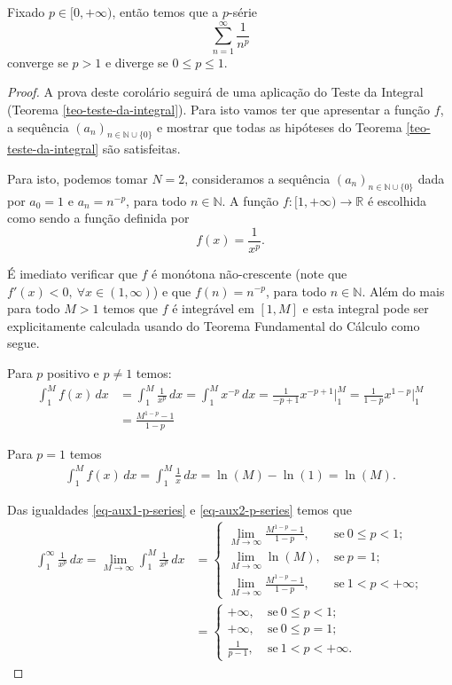 



\begin{corolario}\label{cor-crit-conv-p-series}
Fixado $p\in [0,+\infty)$, então temos que a $p$-série 
\[
\sum_{n=1}^{\infty} \frac{1}{n^p}
\] 
converge se $p>1$ e diverge se $0\leqslant p\leqslant 1$.
\end{corolario}

\begin{proof}
A prova deste corolário seguirá de uma aplicação do Teste da Integral
(Teorema \ref{teo-teste-da-integral}). Para isto vamos ter que apresentar 
a função $f$, a sequência $(a_n)_{n\in\mathbb{N}\cup\{0\}}$ e 
mostrar que todas as hipóteses do Teorema \ref{teo-teste-da-integral}
são satisfeitas. 

\medskip 
Para isto, podemos tomar $N=2$,
consideramos a sequência $(a_n)_{n\in\mathbb{N}\cup\{0\}}$ dada por $a_0=1$ e 
$a_n=n^{-p}$, para todo $n\in\mathbb{N}$. A função $f:[1,+\infty)\to\mathbb{R}$ 
é escolhida como sendo a função definida por
\[
f(x) = \frac{1}{x^p}.
\]

É imediato verificar que $f$ é monótona não-crescente (note que
$f'(x)<0,\ \forall x\in(1,\infty)$) e que $f(n) = n^{-p}$, para todo $n\in\mathbb{N}$.
Além do mais para todo $M>1$ temos que $f$ é integrável em $[1,M]$ e 
esta integral pode ser explicitamente calculada usando do Teorema Fundamental do Cálculo
como segue. 

Para $p$ positivo e  $p\neq 1$ temos:
\begin{align}\label{eq-aux1-p-series}
\int_{1}^{M}f(x)\, dx
&=
\int_{1}^{M}\frac{1}{x^p}\, dx
=
\int_{1}^{M}x^{-p}\, dx
=
\frac{1}{-p+1} x^{-p+1}\Big|_{1}^{M}
=
\frac{1}{1-p} x^{1-p}\Big|_{1}^{M}
\nonumber
\\[0.3cm]
&=
\frac{M^{1-p}-1}{1-p}
\end{align}

Para $p=1$ temos 
\begin{align}\label{eq-aux2-p-series}
\int_{1}^{M}f(x)\, dx
=
\int_{1}^{M}\frac{1}{x}\, dx
=
\ln(M)-\ln(1)= \ln(M).
\end{align}


Das igualdades \eqref{eq-aux1-p-series} e \eqref{eq-aux2-p-series}
temos que
\begin{align*}
\int_{1}^{\infty} \frac{1}{x^p}\, dx
=
\lim_{M\to\infty} \int_{1}^{M} \frac{1}{x^p}\, dx
&=
\begin{cases}
\displaystyle
\lim_{M\to\infty} \frac{M^{1-p}-1}{1-p},&\ \text{se}\ 0\leqslant p<1;
\\[0.5cm]
\displaystyle
\lim_{M\to\infty} \ln(M),&\ \text{se}\  p=1;
\\[0.5cm]
\displaystyle
\lim_{M\to\infty} \frac{M^{1-p}-1}{1-p},&\ \text{se}\ 1< p<+\infty;
\end{cases}
\\[0.5cm]
&=
\begin{cases}
\displaystyle
+\infty,&\ \text{se}\ 0\leqslant p<1;
\\[0.2cm]
\displaystyle
+\infty,&\ \text{se}\ 0\leqslant p=1;
\\[0.2cm]
\displaystyle
\frac{1}{p-1},&\ \text{se}\ 1< p<+\infty.
\end{cases}
\end{align*}


\end{proof}

